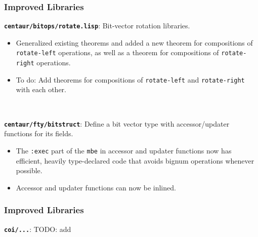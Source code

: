 \documentclass{beamer}
\newcommand{\code}[1]{\texttt{#1}}
\newcommand{\bookpath}[1]{\textbf{\code{#1}}}
\newcommand{\implibtitle}{\frametitle{Improved Libraries}}
\begin{document}
\begin{frame}

\implibtitle

\bookpath{centaur/bitops/rotate.lisp}:
Bit-vector rotation libraries.
\begin{itemize}
\item
Generalized existing theorems and added a new theorem for compositions
of \code{rotate-left} operations, as well as a theorem for
compositions of \code{rotate-right} operations.
\item
To do: Add theorems for compositions of \code{rotate-left} and
\code{rotate-right} with each other.
\end{itemize}

\

\bookpath{centaur/fty/bitstruct}:
Define a bit vector type with accessor/updater functions for its fields.
\begin{itemize}
\item
The \code{:exec} part of the \code{mbe} in accessor and updater
functions now has efficient, heavily type-declared code that avoids
bignum operations whenever possible.
\item
Accessor and updater functions can now be inlined.
\end{itemize}

\end{frame}


\begin{frame}

\implibtitle

\bookpath{coi/...}:
TODO: add

\end{frame}

\end{document}
